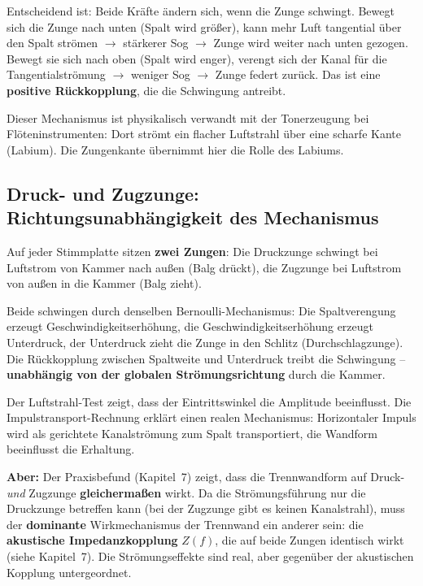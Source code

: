 \documentclass[11pt,a4paper]{article}
\begin{document}
Entscheidend ist: Beide Kräfte ändern sich, wenn die Zunge schwingt. Bewegt sich die Zunge nach unten (Spalt wird größer), kann mehr Luft tangential über den Spalt strömen $\rightarrow$ stärkerer Sog $\rightarrow$ Zunge wird weiter nach unten gezogen. Bewegt sie sich nach oben (Spalt wird enger), verengt sich der Kanal für die Tangentialströmung $\rightarrow$ weniger Sog $\rightarrow$ Zunge federt zurück. Das ist eine \textbf{positive Rückkopplung}, die die Schwingung antreibt.

Dieser Mechanismus ist physikalisch verwandt mit der Tonerzeugung bei Flöteninstrumenten: Dort strömt ein flacher Luftstrahl über eine scharfe Kante (Labium). Die Zungenkante übernimmt hier die Rolle des Labiums.

\subsection{Druck- und Zugzunge: Richtungsunabhängigkeit des Mechanismus}

Auf jeder Stimmplatte sitzen \textbf{zwei Zungen}: Die Druckzunge schwingt bei Luftstrom von Kammer nach außen (Balg drückt), die Zugzunge bei Luftstrom von außen in die Kammer (Balg zieht).

Beide schwingen durch denselben Bernoulli-Mechanismus: Die Spaltverengung erzeugt Geschwindigkeitserhöhung, die Geschwindigkeitserhöhung erzeugt Unterdruck, der Unterdruck zieht die Zunge in den Schlitz (Durchschlagzunge). Die Rückkopplung zwischen Spaltweite und Unterdruck treibt die Schwingung -- \textbf{unabhängig von der globalen Strömungsrichtung} durch die Kammer.

\begin{keybox}
Der Luftstrahl-Test zeigt, dass der Eintrittswinkel die Amplitude beeinflusst. Die Impulstransport-Rechnung erklärt einen realen Mechanismus: Horizontaler Impuls wird als gerichtete Kanalströmung zum Spalt transportiert, die Wandform beeinflusst die Erhaltung.

\textbf{Aber:} Der Praxisbefund (Kapitel~7) zeigt, dass die Trennwandform auf Druck- \textit{und} Zugzunge \textbf{gleichermaßen} wirkt. Da die Strömungsführung nur die Druckzunge betreffen kann (bei der Zugzunge gibt es keinen Kanalstrahl), muss der \textbf{dominante} Wirkmechanismus der Trennwand ein anderer sein: die \textbf{akustische Impedanzkopplung} $Z(f)$, die auf beide Zungen identisch wirkt (siehe Kapitel~7). Die Strömungseffekte sind real, aber gegenüber der akustischen Kopplung untergeordnet.
\end{keybox}
\end{document}
